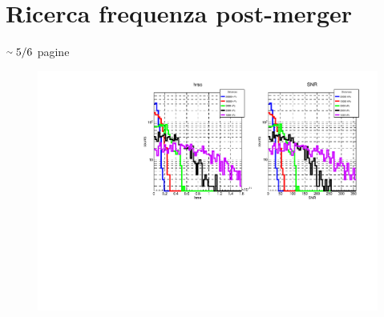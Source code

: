 \section{Ricerca frequenza post-merger}
\begin{center}
	$\smallsim 5/6$ pagine
\end{center}

\begin{center}
	\begin{figure}[H]
		\centering
		\includegraphics[scale=0.68, angle=0]{figures/Capitolo_4/hrss_snr_Distribution.pdf}
		\setlength{\belowcaptionskip}{-20pt}
		\caption{}
		\label{fig:hrss_snr_distribution}
	\end{figure}
\end{center}	

\lipsum[8]
\lipsum[9]